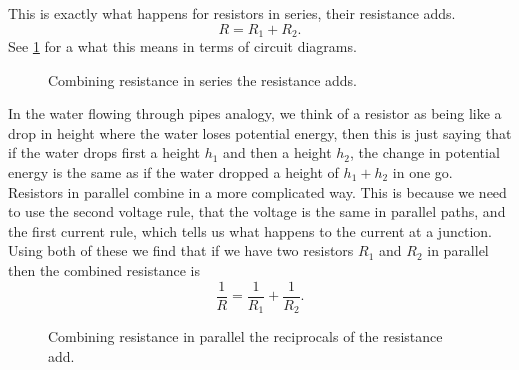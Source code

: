 \documentclass[a4paper,12pt]{book}
\begin{document}
This is exactly what happens for resistors in series, their resistance adds. 
\begin{equation}
R=R_{1}+R_{2}.
\label{eq: resistors in series}
\end{equation} 
See \cref{fig: resistance in series} for a what this means in terms of circuit diagrams.\\
  \begin{figure}[ht]
    \centering
    \caption{Combining resistance in series the resistance adds.}
    \label{fig: resistance in series}
\end{figure}

In the water flowing through pipes analogy, we think of a resistor as being like a drop in height where the water loses potential energy, then this is just saying that if the water drops first a height $h_{1}$ and then a height $h_{2}$, the change in potential energy is the same as if the water dropped a height of $h_{1}+h_{2}$ in one go.\\

Resistors in parallel combine in a more complicated way. This is because we need to use the second voltage rule, that the voltage is the same in parallel paths, and the first current rule, which tells us what happens to the current at a junction. Using both of these we find that if we have two resistors $R_{1}$ and $R_{2}$ in parallel then the combined resistance is
\begin{equation}
\frac{1}{R}=\frac{1}{R_{1}}+\frac{1}{R_{2}}.
\label{eq: resistors in parallel}
\end{equation}

  \begin{figure}[ht]
    \centering
    \caption{Combining resistance in parallel the reciprocals of the resistance add.}
    \label{fig: resistors in parallel}
\end{figure}
\end{document}
